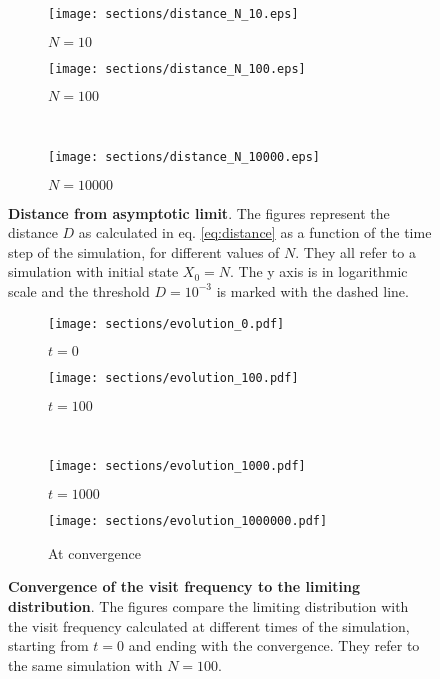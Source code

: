 \begin{figure}[H]
  \begin{subfigure}{.5\textwidth}
      \centering
      \texttt{[image: sections/distance\_N\_10.eps]}
      \caption{$N = 10$}
    \end{subfigure}
    \begin{subfigure}{.5\textwidth}
      \centering
      \texttt{[image: sections/distance\_N\_100.eps]}
      \caption{$N = 100$}
    \end{subfigure}\\
    \begin{center}
    \begin{subfigure}{0.5\textwidth}
      \centering
      \texttt{[image: sections/distance\_N\_10000.eps]}
      \caption{$N = 10000$}
    \end{subfigure}%
  \end{center}

  \captionsetup{width=.9\linewidth}
  \caption{\textbf{Distance from asymptotic limit}. The figures represent the distance $D$ as calculated in eq. \ref{eq:distance} as a function of the time step of the simulation, for different values of $N$. They all refer to a simulation with initial state $X_0 = N$. The y axis is in logarithmic scale and the threshold $D = 10^{-3}$ is marked with the dashed line.}
  \label{fig:distances}
\end{figure}

\begin{figure}
  \begin{subfigure}{.5\textwidth}
      \centering
      \texttt{[image: sections/evolution\_0.pdf]}
      \caption{$t = 0$}
    \end{subfigure}
    \begin{subfigure}{.5\textwidth}
      \centering
      \texttt{[image: sections/evolution\_100.pdf]}
      \caption{$t = 100$}
    \end{subfigure}\\
    \begin{subfigure}{0.5\textwidth}
      \centering
      \texttt{[image: sections/evolution\_1000.pdf]}
      \caption{$t = 1000$}
    \end{subfigure}%
    \begin{subfigure}{0.5\textwidth}
      \centering
      \texttt{[image: sections/evolution\_1000000.pdf]}
      \caption{At convergence}
    \end{subfigure}

  \captionsetup{width=.9\linewidth}
  \caption{\textbf{Convergence of the visit frequency to the limiting distribution}. The figures compare the limiting distribution with the visit frequency calculated at different times of the simulation, starting from $t = 0$ and ending with the convergence. They refer to the same simulation with $N = 100$.}
  \label{fig:evolution}
\end{figure}


